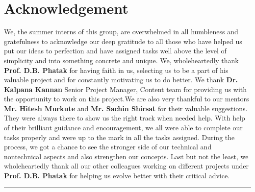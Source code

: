 \documentclass[a4paper, twosided, openany]{memoir}
\begin{document}
\newpage

\chapter*{Acknowledgement}
	We, the summer interns of this group, are overwhelmed in all humbleness and
gratefulness to acknowledge our deep gratitude to all those who have helped us put
our ideas to perfection and have assigned tasks well above the level of simplicity and
into something concrete and unique.
We, wholeheartedly thank \textbf{Prof. D.B. Phatak} for having faith in us, selecting us to be
a part of his valuable project and for constantly motivating us to do better.
We thank \textbf{Dr. Kalpana Kannan} Senior Project Manager, Content team for providing us with the opportunity to work on this
project.We are also very thankful to our mentors \textbf{Mr. Hitesh Murkute} and \textbf{Mr. Sachin Shirsat}
for their valuable suggestions. They were always there to show us the right track when needed help.
With help of their brilliant guidance and encouragement, we all were able to complete
our tasks properly and were up to the mark in all the tasks assigned. During the
process, we got a chance to see the stronger side of our technical and nontechnical
aspects and also strengthen our concepts.
Last but not the least, we wholeheartedly thank all our other colleagues working on
different projects under \textbf{Prof. D.B. Phatak} for helping us evolve better with their critical advice.\newline
\par\fancybreak{$***$}\par
\newpage

\tableofcontents

\mainmatter










\end{document}
